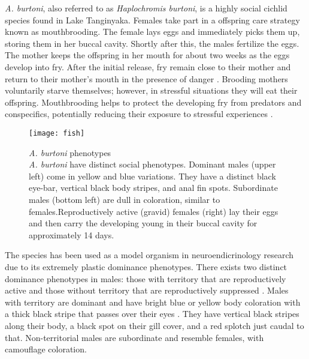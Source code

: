 \documentclass[12pt,twoside]{reedthesis}
\begin{document}
 \textit{A. burtoni}, also referred to as \textit{Haplochromis burtoni}, is a
 highly social cichlid species found in Lake Tanginyaka. Females take part in a offspring care strategy known as mouthbrooding. The female lays eggs and immediately picks them up, storing them in
her buccal cavity. Shortly after this, the males fertilize the eggs. The
mother keeps the offspring in her mouth for about two weeks as the eggs
develop into fry. After the initial release, fry remain close to their mother
and return to their mother's mouth in the presence of danger \citep{renn_maternal_2009}. Brooding
mothers voluntarily starve themselves; however, in stressful situations they
will eat their offspring. Mouthbrooding helps to protect the developing fry from
predators and conspecifics, potentially reducing their exposure to stressful
experiences \citep{renn_maternal_2009}.

\begin{figure}[htbp] 
\begin{centering} 
\texttt{[image: fish]}
\caption[\textit{A. burtoni} phenotypes]{\footnotesize{\textit{A. burtoni} phenotypes
     \citep{fernald_social_2012} \\ \textit{A. burtoni} have distinct social
     phenotypes. Dominant males (upper left) come in yellow and blue variations.
   They have a distinct black eye-bar, vertical black body stripes, and anal fin
   spots. Subordinate males (bottom left) are dull in coloration, similar to
   females.Reproductively active (gravid) females (right) lay their eggs and
   then carry the developing young in their buccal cavity for approximately 14 days.}}
\label{subd}
\end{centering} 
\end{figure}

The species has been used as a model organism in neuroendicrinology research due
to its extremely plastic dominance phenotypes. There exists two distinct dominance phenotypes in males:
those with territory that are reproductively active and those without territory
that are reproductively suppressed \citep{fernald_quantitative_1977}. Males with
territory are dominant and have bright blue or yellow body coloration with a thick black
stripe that passes over their eyes \citep{border_color_2019}. They have vertical black stripes along their
body, a black spot on their gill cover, and a red splotch just caudal to that.
Non-territorial males are subordinate and resemble females, with camouflage
coloration.
\end{document}
